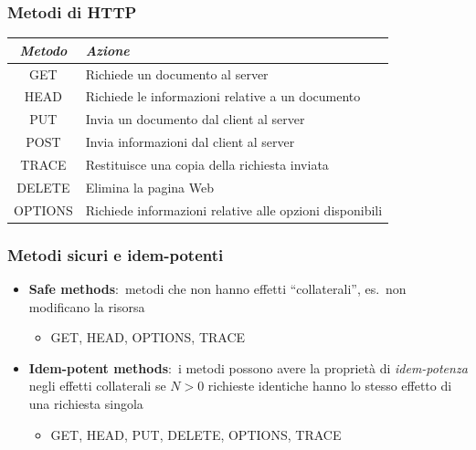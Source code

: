 \subsubsection{Metodi di HTTP}

\begin{center}
    \begin{tabular}{|c|l|}
        \hline
        \emph{Metodo} & \emph{Azione}                                           \\
        \hline
        GET           & Richiede un documento al server                         \\
        \hline
        HEAD          & Richiede le informazioni relative a un documento        \\
        \hline
        PUT           & Invia un documento dal client al server                 \\
        \hline
        POST          & Invia informazioni dal client al server                 \\
        \hline
        TRACE         & Restituisce una copia della richiesta inviata           \\
        \hline
        DELETE        & Elimina la pagina Web                                   \\
        \hline
        OPTIONS       & Richiede informazioni relative alle opzioni disponibili \\
        \hline
    \end{tabular}
\end{center}

\subsubsection{Metodi sicuri e idem-potenti}

\begin{itemize}
    \item \textbf{Safe methods}:\ metodi che non hanno effetti ``collaterali'', es.\
          non modificano la risorsa
          \begin{itemize}
              \item GET, HEAD, OPTIONS, TRACE
          \end{itemize}
    \item \textbf{Idem-potent methods}:\ i metodi possono avere la proprietà di \emph{idem-potenza} negli effetti collaterali se $N>0$ richieste identiche hanno lo stesso effetto di una richiesta singola
          \begin{itemize}
              \item GET, HEAD, PUT, DELETE, OPTIONS, TRACE
          \end{itemize}
\end{itemize}


